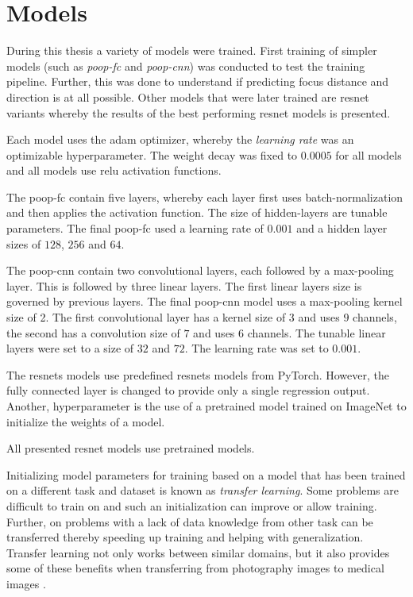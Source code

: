 \section{Models}
\label{sec:Methods:Models}

During this thesis a variety of models were trained. First training of simpler models (such as \emph{\acs{poop}-\acs{fc}} and \emph{\acs{poop}-\acs{cnn}}) was conducted to test the training pipeline. Further, this was done to understand if predicting focus distance and direction is at all possible. Other models that were later trained are \acs{resnet} variants whereby the results of the best performing \acs{resnet} models is presented.

Each model uses the \ac{adam} optimizer, whereby the \emph{learning rate} was an optimizable hyperparameter. The weight decay was fixed to $0.0005$ for all models and all models use \ac{relu} activation functions.

The \acs{poop}-\acs{fc} contain five layers, whereby each layer first uses batch-normalization and then applies the activation function. The size of hidden-layers are tunable parameters. The final \acs{poop}-\acs{fc} used a learning rate of $0.001$ and a hidden layer sizes of $128$, $256$ and $64$.

The \acs{poop}-\acs{cnn} contain two convolutional layers, each followed by a max-pooling layer. This is followed by three linear layers. The first linear layers size is governed by previous layers. The final  \acs{poop}-\acs{cnn} model uses a max-pooling kernel size of 2. The first convolutional layer has a kernel size of $3$ and uses $9$ channels, the second has a convolution size of $7$ and uses $6$ channels. The tunable linear layers were set to a size of $32$ and $72$. The learning rate was set to $0.001$.

The \acp{resnet} models use predefined \acp{resnet} models from PyTorch. However, the fully connected layer is changed to provide only a single regression output. Another, hyperparameter is the use of a pretrained model trained on ImageNet  to initialize the weights of a model.

All presented \ac{resnet} models use pretrained models.

Initializing model parameters for training based on a model that has been trained on a different task and dataset is known as \emph{transfer learning}. Some problems are difficult to train on and such an initialization can improve or allow training. Further, on problems with a lack of data knowledge from other task can be transferred thereby speeding up training and helping with generalization. Transfer learning not only works between similar domains, but it also provides some of these benefits when transferring from photography images to medical images \cite{mustafa2021supervised}.


